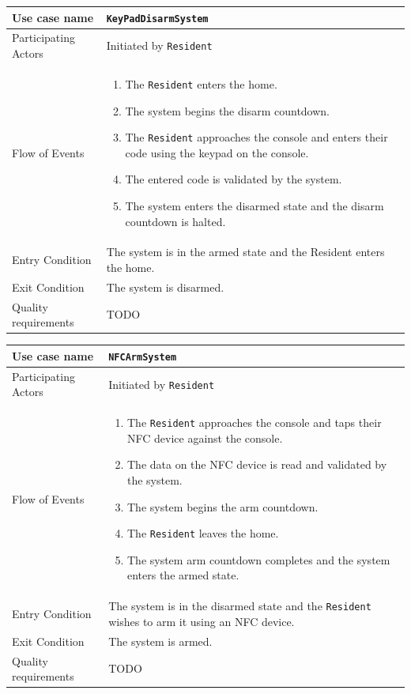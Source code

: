\documentclass{report}
\begin{document}
\begin{tabular}{| l | p{12cm} |}
\hline
Use case name & \texttt{KeyPadDisarmSystem} \\ \hline
Participating Actors & Initiated by \texttt{Resident} \\ \hline
Flow of Events & 

\begin{enumerate}
 \item The \texttt{Resident} enters the home.
 \item The system begins the disarm countdown.
 \item The \texttt{Resident} approaches the console and enters their code using
       the keypad on the console.
 \item The entered code is validated by the system.
 \item The system enters the disarmed state and the disarm countdown is halted.
\end{enumerate}

\\ \hline

Entry Condition & The system is in the armed state and the Resident
enters the home. \\ \hline

Exit Condition & The system is disarmed. \\ \hline
Quality requirements & TODO \\ \hline

\hline
\end{tabular}

\begin{tabular}{| l | p{12cm} |}
\hline
Use case name & \texttt{NFCArmSystem} \\ \hline
Participating Actors & Initiated by \texttt{Resident} \\ \hline
Flow of Events & 

\begin{enumerate}
 \item The \texttt{Resident} approaches the console and taps their NFC device
       against the console.
 \item The data on the NFC device is read and validated by the system.
 \item The system begins the arm countdown.
 \item The \texttt{Resident} leaves the home.
 \item The system arm countdown completes and the system enters the armed state.
\end{enumerate}

\\ \hline

Entry Condition & The system is in the disarmed state and the \texttt{Resident}
wishes to arm it using an NFC device. \\ \hline

Exit Condition & The system is armed. \\ \hline
Quality requirements & TODO \\ \hline

\hline
\end{tabular}
\end{document}
